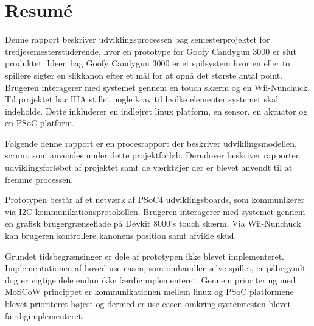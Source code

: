 \chapter{Resumé}
Denne rapport beskriver udviklingsprocessen bag semesterprojektet for tredjesemesterstuderende, hvor en prototype for Goofy Candygun 3000 er slut produktet. Ideen bag Goofy Candygun 3000 er et spilsystem hvor en eller to spillere sigter en slikkanon efter et mål for at opnå det største antal point. Brugeren interagerer med systemet gennem en touch skærm og en Wii-Nunchuck. Til projektet har IHA stillet nogle krav til hvilke elementer systemet skal indeholde. Dette inkluderer en indlejret linux platform, en sensor, en aktuator og en PSoC platform. \newline

\noindent Følgende denne rapport er en procesrapport der beskriver udviklingsmodellen, scrum, som anvendes under dette projektforløb. Derudover beskriver rapporten udviklingsforløbet af projektet samt de værktøjer der er blevet anvendt til at fremme processen. \newline

\noindent Prototypen består af et netværk af PSoC4 udviklingsboards, som kommunikerer via I2C kommunikationsprotokollen. Brugeren interagerer med systemet gennem en grafisk brugergrænseflade på Devkit 8000's touch skærm. Via Wii-Nunchuck kan brugeren kontrollere kanonens position samt afvikle skud. \newline

\noindent Grundet tidsbegrænsinger er dele af prototypen ikke blevet implementeret. Implementationen af hoved use casen, som omhandler selve spillet, er påbegyndt, dog er vigtige dele endnu ikke færdigimplementeret. Gennem prioritering med MoSCoW princippet er kommunikationen mellem linux og PSoC platformene blevet prioriteret højest og dermed er use casen omkring systemtesten blevet færdigimplementeret.

